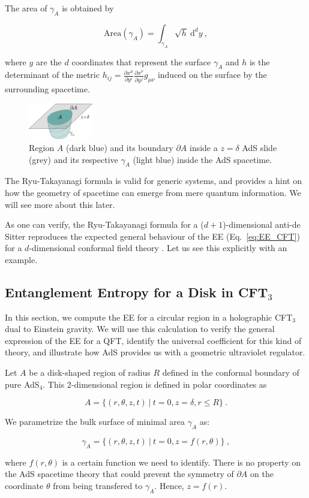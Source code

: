 \documentclass[twocolumn]{revtex4}
\providecommand{\eq}[2]{
    \begin{equation}
        #2
    \label{eq:#1}
    \end{equation}
}
\begin{document}
The area of $\gamma_A$ is obtained by
\eq{EE_RT-area}{
    \text{Area}(\gamma_A) = \int_{\gamma_A} \sqrt{h} \ \mathrm{d}^{d}y \ ,
}
where $y$ are the $d$ coordinates that represent the surface $\gamma_A$ and $h$ is the determinant of the metric $h_{ij} = \frac{\partial x^\mu}{\partial y^i} \frac{\partial x^\nu}{\partial y^j} g_{\mu\nu}$ induced on the surface by the surrounding spacetime.

\begin{figure}
    \centering
    \includegraphics[width=0.25\textwidth]{../imatges/EE_AdS-CFT.png}
\caption{Region $A$ (dark blue) and its boundary $\partial A$ inside a $z=\delta$ AdS slide (grey) and its respective $\gamma_A$ (light blue) inside the AdS spacetime.}
\label{fig:EE_AdS-CFT}
\end{figure}

The Ryu-Takayanagi formula is valid for generic systems, and provides a hint on how the geometry of spacetime can emerge from mere quantum information. We will see more about this later.

As one can verify, the Ryu-Takayanagi formula for a ($d+1$)-dimensional anti-de Sitter reproduces the expected general behaviour of the EE (Eq.~\ref{eq:EE_CFT}) for a $d$-dimensional conformal field theory \cite{ryu_aspects_2006, nishioka_holographic_2009}. Let us see this explicitly with an example.


\subsection{Entanglement Entropy for a Disk in CFT$_3$} \label{ss:EE-disk}

In this section, we compute the EE for a circular region in a holographic CFT$_3$ dual to Einstein gravity. We will use this calculation to verify the general expression of the EE for a QFT, identify the universal coefficient for this kind of theory, and illustrate how AdS provides us with a geometric ultraviolet regulator.

Let $A$ be a disk-shaped region of radius $R$ defined in the conformal boundary of pure AdS$_4$. This 2-dimensional region is defined in polar coordinates as
\eq{1A}{
    A = \{ ( r, \theta, z, t ) \ | \ t = 0, z = \delta, r \le R \} \nonumber \ .
}
We parametrize the bulk surface of minimal area $\gamma_A$ as:
\eq{1gA}{
    \gamma_A = \{ ( r, \theta, z, t ) \ | \ t = 0, z = f (r, \theta) \} \ , \nonumber
}
where $f(r,\theta)$ is a certain function we need to identify. There is no property on the AdS spacetime theory that could prevent the symmetry of $\partial A$ on the coordinate $\theta$ from being transfered to $\gamma_A$. Hence, $z=f(r)$.
\end{document}
